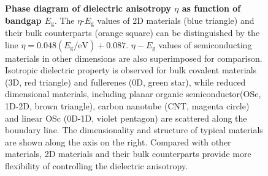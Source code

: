 \begin{figure}[H]
  \centering
  \caption{\textbf{Phase diagram of dielectric anisotropy $\eta$ as
      function of bandgap $E_{\mathrm{g}}$}. The
    $\eta$-$E_{\mathrm{g}}$ values of 2D materials (blue triangle) and
    their bulk counterparts (orange square) can be distinguished by
    the line $\eta=0.048(E_{\mathrm{g}}/\mathrm{eV})+0.087$. $\eta-E_{\mathrm{g}}$ values of
    semiconducting materials in other dimensions are also superimposed
    for comparison. Isotropic dielectric property is observed for bulk
    covalent materials (3D, red triangle) and fullerenes (0D, green
    star), while reduced dimensional materials, including planar
    organic semiconductor(OSc, 1D-2D, brown triangle), carbon nanotube
    (CNT, magenta circle) and linear OSc (0D-1D, violet pentagon) are
    scattered along the boundary line. The dimensionality and
    structure of typical materials are shown along the axis on the
    right. Compared with other materials, 2D materials and their bulk
    counterparts provide more flexibility of controlling the
    dielectric anisotropy.}
  \label{fig:aniso}
\end{figure}



